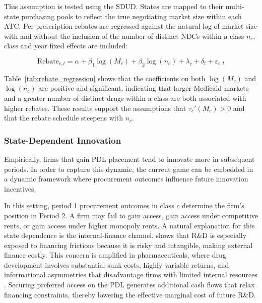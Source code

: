 \documentclass[12pt]{article}
\begin{document}
This assumption is tested using the SDUD. States are mapped to their multi-state purchasing pools to reflect the true negotiating market size within each ATC. Per-prescription rebates are regressed against the natural log of market size with and without the inclusion of the number of distinct NDCs within a class $n_c$, class and year fixed effects are included:

\begin{equation}
    \text{Rebate}_{c,t} = \alpha + \beta_1 \log(M_c) + \beta_2 \log(n_c) + \lambda_c + \delta_t + \varepsilon_{c,t}
\end{equation}

Table~\ref{tab:rebate_regression} shows that the coefficients on both $\log(M_c)$ and $\log(n_c)$ are positive and significant, indicating that larger Medicaid markets and a greater number of distinct drugs within a class are both associated with higher rebates. These results support the assumptions that $\tau_c'(M_c)>0$ and that the rebate schedule steepens with $n_c$.



\subsubsection{State-Dependent Innovation}
Empirically, firms that gain PDL placement tend to innovate more in subsequent periods. In order to capture this dynamic, the current game can be embedded in a dynamic framework where procurement outcomes influence future innovation incentives.

In this setting, period 1 procurement outcomes in class $c$ determine the firm's position in Period 2. A firm may fail to gain access, gain access under competitive rents, or gain access under higher monopoly rents. A natural explanation for this state dependence is the internal-finance channel. \cite{hal2002financing} shows that R\&D is especially exposed to financing frictions because it is risky and intangible, making external finance costly. This concern is amplified in pharmaceuticals, where drug development involves substantial sunk costs, highly variable returns, and informational asymmetries that disadvantage firms with limited internal resources \citep{sutton1998technology}. Securing preferred access on the PDL generates additional cash flows that relax financing constraints, thereby lowering the effective marginal cost of future R\&D.
\end{document}
